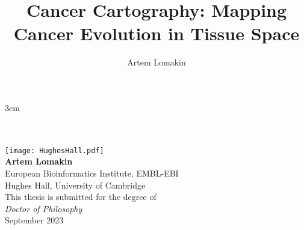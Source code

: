 \documentclass[a4paper,english, twoside, titlepage, DIV=8, BCOR=8.5mm, open=right, chapterprefix=false]{scrbook}
\title{Cancer Cartography: Mapping Cancer Evolution in Tissue Space}
\author{Artem Lomakin}
\begin{document}
\emergencystretch 3em %

\begin{titlepage}
    \centering
    \noindent{}\\[0.35cm]
    \noindent{}\\[2cm]
    
    \texttt{[image: HughesHall.pdf]}\\[2cm]

    \textbf{\LARGE Artem Lomakin}\\[0.4cm]
    {\Large European Bioinformatics Institute, EMBL-EBI}\\[0.2cm]
    {\Large Hughes Hall, University of Cambridge}\\[1.5cm]
    
    {\Large This thesis is submitted for the degree of}\\[0.2cm]
    \textit{\Large Doctor of Philosophy}\\[2.5cm]
    
    {\Large September 2023}
\end{titlepage}

\frontmatter



\tableofcontents
\listoffigs
\listofabbrev

\mainmatter







\appendix







\listofreferences
\end{document}
